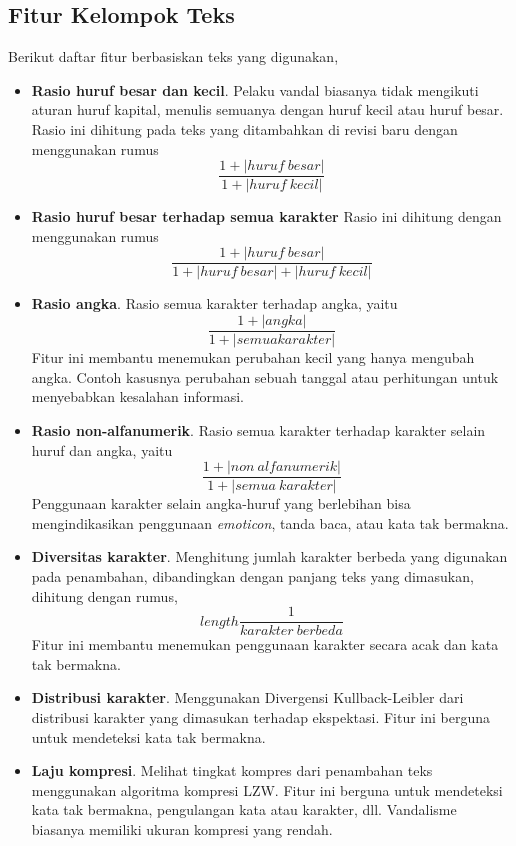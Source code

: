 \subsection{Fitur Kelompok Teks}

Berikut daftar fitur berbasiskan teks yang digunakan,

\begin{itemize}

\item \textbf{Rasio huruf besar dan kecil}.
Pelaku vandal biasanya tidak mengikuti aturan huruf kapital, menulis semuanya
dengan huruf kecil atau huruf besar.
Rasio ini dihitung pada teks yang ditambahkan di revisi baru dengan menggunakan
rumus
\[
\frac{1 + |huruf\ besar|}{1 + |huruf\ kecil|}
\]

\item \textbf{Rasio huruf besar terhadap semua karakter}
Rasio ini dihitung dengan menggunakan rumus
\[
\frac{1 + |huruf\ besar|}{1 + |huruf\ besar| + |huruf\ kecil|}
\]

\item \textbf{Rasio angka}.
Rasio semua karakter terhadap angka, yaitu
\[
\frac{1 + |angka|}{1 + |semua karakter|}
\]
Fitur ini membantu menemukan perubahan kecil yang hanya mengubah angka.
Contoh kasusnya perubahan sebuah tanggal atau perhitungan untuk menyebabkan
kesalahan informasi.

\item \textbf{Rasio non-alfanumerik}.
Rasio semua karakter terhadap karakter selain huruf dan angka, yaitu
\[
\frac{1 + |non\ alfanumerik|}{1 + |semua\ karakter|}
\]
Penggunaan karakter selain angka-huruf yang berlebihan bisa mengindikasikan
penggunaan \textit{emoticon}, tanda baca, atau kata tak bermakna.

\item \textbf{Diversitas karakter}.
Menghitung jumlah karakter berbeda yang digunakan pada penambahan, dibandingkan dengan panjang teks yang dimasukan,
dihitung dengan rumus,
\[
length \frac{1}{karakter\ berbeda}
\]
Fitur ini membantu menemukan penggunaan karakter secara acak dan kata tak
bermakna.

\item \textbf{Distribusi karakter}.
Menggunakan Divergensi Kullback-Leibler dari distribusi karakter yang dimasukan
terhadap ekspektasi.
Fitur ini berguna untuk mendeteksi kata tak bermakna.

\item \textbf{Laju kompresi}.
Melihat tingkat kompres dari penambahan teks menggunakan algoritma kompresi
LZW.
Fitur ini berguna untuk mendeteksi kata tak bermakna, pengulangan kata atau
karakter, dll.
Vandalisme biasanya memiliki ukuran kompresi yang rendah.


\end{itemize}
